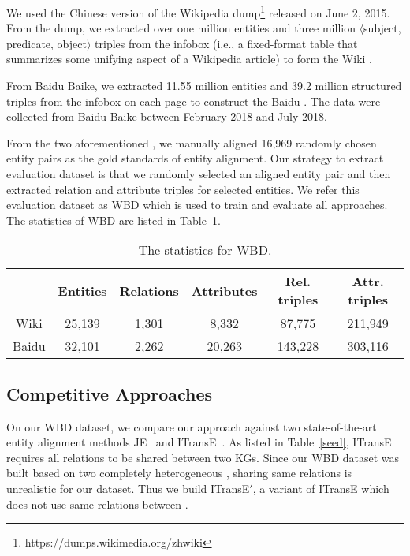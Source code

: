 	We used the Chinese version of the Wikipedia dump\footnote{https://dumps.wikimedia.org/zhwiki} released on June 2, 2015.
    From the dump, we extracted over one million entities and three million $\langle$subject, predicate, object$\rangle$ triples from the infobox (i.e., a fixed-format table that summarizes some unifying aspect of a Wikipedia article) to form the Wiki \KG.
	
	 From Baidu Baike, we extracted 11.55 million entities and 39.2 million structured triples from the infobox on each page to construct the Baidu \KG.
	The data were collected from Baidu Baike between February 2018 and July 2018.

	
	 From the two aforementioned \KGs, we manually aligned 16,969 randomly chosen entity pairs as the gold standards of entity alignment.
	Our strategy to extract evaluation dataset is that we randomly selected an aligned entity pair and then extracted relation and attribute triples for selected entities.
	We refer this evaluation dataset as WBD which is used to train and evaluate all approaches. The statistics of WBD are listed in Table~\ref{dataset}.
	


	\begin{table}
	\centering
	\scriptsize
	\begin{tabular}{c|ccccc}
		\toprule
		&\bf  Entities &\bf  Relations &\bf  Attributes &\bf  Rel. triples &\bf  Attr. triples \\
		\midrule
		Wiki & 25,139 & 1,301 & 8,332 & 87,775 & 211,949 \\
		Baidu & 32,101 & 2,262 & 20,263 & 143,228 & 303,116 \\
		\bottomrule
	\end{tabular}
	\caption{The statistics for WBD.}
	\label{dataset}
\end{table}


	\subsection{Competitive Approaches}
	On our WBD dataset, we compare our approach against two state-of-the-art entity alignment methods JE~\cite{hao2016joint} and
ITransE~\cite{zhu2017iterative}. As listed in Table~\ref{seed}, ITransE requires all relations to be shared between two KGs. Since our WBD
dataset was built based on two completely heterogeneous \KGs, sharing same relations is unrealistic for our dataset. Thus we build
ITransE$'$, a variant of ITransE which does not use same relations between \KGs. 	


